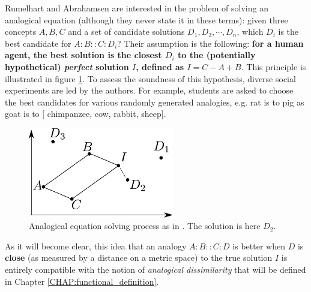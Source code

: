 Rumelhart and Abrahamsen are interested in the problem of solving an analogical
equation (although they never state it in these terms): given three concepts
$A, B, C$ and a set of candidate solutions $D_1, D_2, \cdots, D_n$, which $D_i$
is the best candidate for $A:B::C:D_i$? Their assumption is the following:
\textbf{ for a human agent, the best solution is the closest $D_i$ to the
(potentially hypothetical) \textit{perfect} solution $I$, defined as $I = C - A
+ B$}. This principle is illustrated in figure \ref{FIG:rumelhart_model}.
To assess the soundness of this hypothesis, diverse social experiments are led
by the authors. For example, students are asked to choose the best candidates
for various randomly generated analogies, e.g. rat is to pig as goat is to $[$
chimpanzee, cow, rabbit, sheep$]$.

\begin{figure}[!h]
\centering
\includegraphics[width=2.5in]{figures/rumelhart_model.pdf}
  \caption{Analogical equation solving process as in \cite{RumAbr73}. The
  solution is here $D_2$.}
\label{FIG:rumelhart_model}
\end{figure}

As it will become clear, this idea that an analogy $A:B::C:D$ is better when
$D$ is \textbf{close} (as measured by a distance on a metric space) to the true
solution $I$ is entirely compatible with the notion of \textit{analogical
dissimilarity} that will be defined in Chapter \ref{CHAP:functional_definition}.

